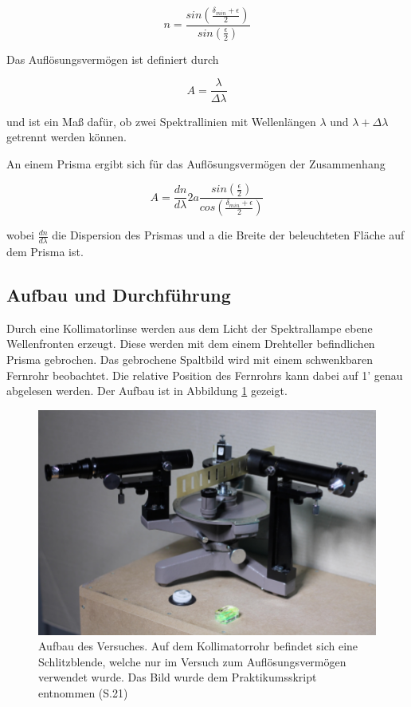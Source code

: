 \documentclass[12pt,a4paper]{article}
\begin{document}
	\begin{equation}
	n = \frac{sin(\frac{\delta_{min}+\epsilon}{2})}{sin(\frac{\epsilon}{2})}
	\end{equation}
	
	Das Auflösungsvermögen ist definiert durch
	
	\begin{equation}
	A = \frac{\lambda}{\Delta \lambda}
	\end{equation} 
	
	und ist ein Maß dafür, ob zwei Spektrallinien mit Wellenlängen $\lambda$ und $\lambda + \Delta \lambda$ getrennt werden können.
	
	An einem Prisma ergibt sich für das Auflösungsvermögen der Zusammenhang
	
	\begin{equation}
	A = \frac{dn}{d\lambda} 2a \frac{sin(\frac{\epsilon}{2})}{cos(\frac{\delta_{min}+\epsilon}{2})}
	\end{equation}
	
	wobei $\frac{dn}{d\lambda}$ die Dispersion des Prismas und a die Breite der beleuchteten Fläche auf dem Prisma ist.
	
	
	
	\subsection{Aufbau und Durchführung}
	Durch eine Kollimatorlinse werden aus dem Licht der Spektrallampe ebene Wellenfronten erzeugt. Diese werden mit dem einem Drehteller befindlichen Prisma gebrochen. Das gebrochene Spaltbild wird mit einem schwenkbaren Fernrohr beobachtet. Die relative Position des Fernrohrs kann dabei auf 1' genau abgelesen werden.
	Der Aufbau ist in Abbildung \ref{fig:AufbauPrisma} gezeigt.
	
	\begin{figure}
		\begin{center}
			\includegraphics[scale=1.0]{Bilder/AufbauPrisma}
			\caption{Aufbau des Versuches. Auf dem Kollimatorrohr befindet sich eine Schlitzblende, welche nur im Versuch zum Auflösungsvermögen verwendet wurde. Das Bild wurde dem Praktikumsskript entnommen (S.21)}
			\label{fig:AufbauPrisma}
		\end{center}
	\end{figure}
	
\end{document}
